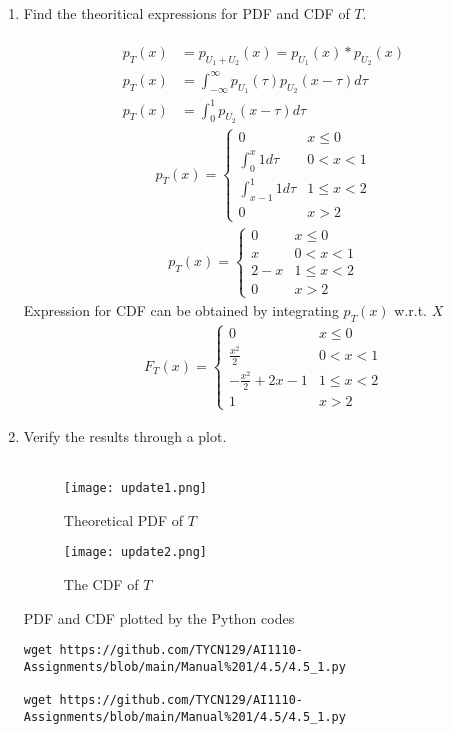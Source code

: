 \documentclass[journal,12pt,twocolumn]{IEEEtran}
\renewcommand\thesection{\arabic{section}}
\begin{document}
\begin{enumerate}[label=\thesection.\arabic*
,ref=\thesection.\theenumi]
\item Find the theoritical expressions for PDF and CDF of $T$.\\
\solution\\
\begin{align}
    p_T(x) &= p_{U_1 + U_2}(x) = p_{U_1}(x) * p_{U_2}(x)\\
    p_T(x) &= \int_{-\infty}^{\infty}p_{U_1}(\tau)p_{U_2}(x - \tau)d\tau\\
    p_T(x) &= \int_0^1p_{U_2}(x - \tau)d\tau
\end{align}
\begin{align}
    \displaystyle p_T(x) = \begin{cases} 
    0 & \text{$x \leq 0$} \\  
    \int_0^x 1d\tau & \text{$0 < x < 1$} \\  
    \int_{x - 1}^1 1d\tau & \text{$1 \leq x < 2$} \\
    0 & \text{$x > 2$}
    \end{cases}
\end{align}
\begin{align}
    \displaystyle p_T(x) = \begin{cases} 
    0 & \text{$x \leq 0$} \\  
    x & \text{$0 < x < 1$} \\  
    2 - x & \text{$1 \leq x < 2$} \\
    0 & \text{$x > 2$}
    \end{cases}
\end{align}
Expression for CDF can be obtained by integrating $p_T(x)$ w.r.t. $X$
\begin{align}
    \displaystyle F_T(x) = \begin{cases} 
    0 & \text{$x \leq 0$} \\  
    \frac{x^2}{2} & \text{$0 < x < 1$} \\  
    -\frac{x^2}{2} + 2x - 1 & \text{$1 \leq x < 2$} \\
    1 & \text{$x > 2$}
    \end{cases}
\end{align}

\item Verify the results through a plot.\\
\solution\\
\begin{figure}[h!]
    \centering
    \texttt{[image: update1.png]}
    \caption{Theoretical PDF of $T$}
    \label{fig:my_label}
\end{figure}
\begin{figure}[H]
    \centering
    \texttt{[image: update2.png]}
    \caption{The CDF of $T$}
    \label{fig:my_label}
\end{figure}
PDF and CDF plotted by the Python codes
\begin{lstlisting}
wget https://github.com/TYCN129/AI1110-Assignments/blob/main/Manual%201/4.5/4.5_1.py

wget https://github.com/TYCN129/AI1110-Assignments/blob/main/Manual%201/4.5/4.5_1.py
\end{lstlisting}
\end{enumerate}
\end{document}

